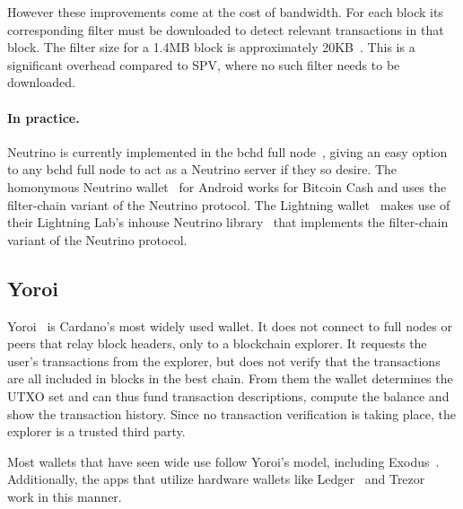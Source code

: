 However these improvements come at the cost of bandwidth. For each block its corresponding filter must be downloaded to detect relevant transactions in that block. The filter size for a 1.4MB block is approximately 20KB~\cite{jimmysong}. This is a significant overhead compared to SPV, where no such filter needs to be downloaded.

\paragraph{In practice.}
Neutrino is currently implemented in the bchd full node~\cite{bchd}, giving an easy option to any bchd full node to act as a Neutrino server if they so desire. The homonymous Neutrino wallet~\cite{neutrino-wallet} for Android works for Bitcoin Cash and uses the filter-chain variant of the Neutrino protocol. The Lightning wallet~\cite{lightning-wallet} makes use of their Lightning Lab's inhouse Neutrino library~\cite{neutrino-library} that implements the filter-chain variant of the Neutrino protocol.

\subsection{Yoroi}
Yoroi~\cite{yoroi} is Cardano's most widely used wallet. It does not connect to full nodes or peers that relay block headers, only to a blockchain explorer. It requests the user's transactions from the explorer, but does not verify that the transactions are all included in blocks in the best chain. From them the wallet determines the UTXO set and can thus fund transaction descriptions, compute the balance and show the transaction history. Since no transaction verification is taking place, the explorer is a trusted third party.

Most wallets that have seen wide use follow Yoroi's model, including Exodus~\cite{exodus}. Additionally, the apps that utilize hardware wallets like Ledger~\cite{ledger-live} and Trezor~\cite{trezor-beta} work in this manner.
